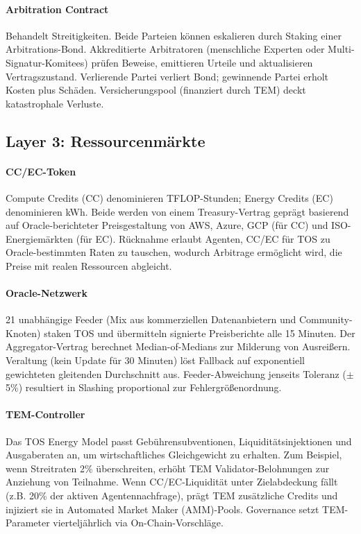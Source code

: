 \documentclass[11pt]{article}
\begin{document}
\paragraph{Arbitration Contract} Behandelt Streitigkeiten. Beide Parteien können eskalieren durch Staking einer Arbitrations-Bond. Akkreditierte Arbitratoren (menschliche Experten oder Multi-Signatur-Komitees) prüfen Beweise, emittieren Urteile und aktualisieren Vertragszustand. Verlierende Partei verliert Bond; gewinnende Partei erholt Kosten plus Schäden. Versicherungspool (finanziert durch TEM) deckt katastrophale Verluste.

\subsection{Layer 3: Ressourcenmärkte}
\paragraph{CC/EC-Token} Compute Credits (CC) denominieren TFLOP-Stunden; Energy Credits (EC) denominieren kWh. Beide werden von einem Treasury-Vertrag geprägt basierend auf Oracle-berichteter Preisgestaltung von AWS, Azure, GCP (für CC) und ISO-Energiemärkten (für EC). Rücknahme erlaubt Agenten, CC/EC für TOS zu Oracle-bestimmten Raten zu tauschen, wodurch Arbitrage ermöglicht wird, die Preise mit realen Ressourcen abgleicht.

\paragraph{Oracle-Netzwerk} 21 unabhängige Feeder (Mix aus kommerziellen Datenanbietern und Community-Knoten) staken TOS und übermitteln signierte Preisberichte alle 15 Minuten. Der Aggregator-Vertrag berechnet Median-of-Medians zur Milderung von Ausreißern. Veraltung (kein Update für 30 Minuten) löst Fallback auf exponentiell gewichteten gleitenden Durchschnitt aus. Feeder-Abweichung jenseits Toleranz ($\pm$5\%) resultiert in Slashing proportional zur Fehlergrößenordnung.

\paragraph{TEM-Controller} Das TOS Energy Model passt Gebührensubventionen, Liquiditätsinjektionen und Ausgaberaten an, um wirtschaftliches Gleichgewicht zu erhalten. Zum Beispiel, wenn Streitraten 2\% überschreiten, erhöht TEM Validator-Belohnungen zur Anziehung von Teilnahme. Wenn CC/EC-Liquidität unter Zielabdeckung fällt (z.B. 20\% der aktiven Agentennachfrage), prägt TEM zusätzliche Credits und injiziert sie in Automated Market Maker (AMM)-Pools. Governance setzt TEM-Parameter vierteljährlich via On-Chain-Vorschläge.
\end{document}
